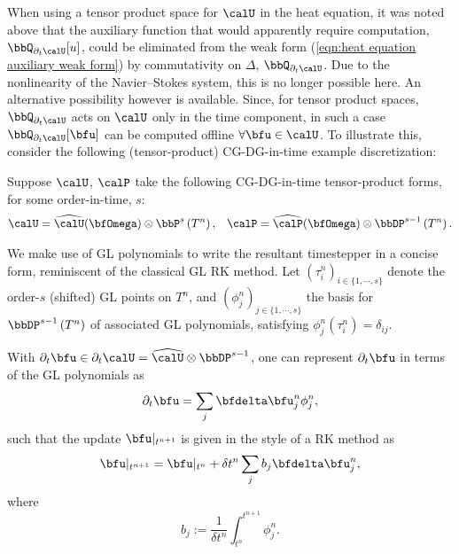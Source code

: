     When using a tensor product space for $\calU$ in the heat equation, it was noted above that the auxiliary function that would apparently require computation, $\bbQ_{\partial_{t}\calU}[u]$, could be eliminated from the weak form (\ref{eqn:heat equation auxiliary weak form}) by commutativity on $\Delta$, $\bbQ_{\partial_{t}\calU}$. Due to the nonlinearity of the Navier--Stokes system, this is no longer possible here. An alternative possibility however is available. Since, for tensor product spaces, $\bbQ_{\partial_{t}\calU}$ acts on $\calU$ only in the time component, in such a case $\bbQ_{\partial_{t}\calU}[\bfu]$ can be computed offline $\forall \bfu \in \calU$. To illustrate this, consider the following (tensor-product) CG-DG-in-time example discretization:

    \begin{example}
        Suppose $\calU$, $\calP$ take the following CG-DG-in-time tensor-product forms, for some order-in-time, $s$:
        \begin{align}
            \calU  =  \widehat{\calU}(\bfOmega)\otimes\bbP^{s}\left(T^{n}\right),  &&
            \calP  =  \widehat{\calP}(\bfOmega)\otimes\bbDP^{s - 1}\left(T^{n}\right).
        \end{align}

        We make use of GL polynomials to write the resultant timestepper in a concise form, reminiscent of the classical GL RK method. Let $\left(\tau^{n}_{i}\right)_{i \in \{1, \cdots, s\}}$ denote the order-$s$ (shifted) GL points on $T^{n}$, and $\left(\phi^{n}_{j}\right)_{j \in \{1, \cdots, s\}}$ the basis for $\bbDP^{s - 1}\left(T^{n}\right)$ of associated GL polynomials, satisfying $\phi^{n}_{j}(\tau^{n}_{i}) = \delta_{ij}$.

        With $\partial_{t}\bfu \in \partial_{t}\calU = \widehat{\calU}\otimes\bbDP^{s - 1}$, one can represent $\partial_{t}\bfu$ in terms of the GL polynomials as
        \begin{equation}
            \partial_{t}\bfu  =  \sum_{j}\bfdelta\bfu^{n}_{j}\phi^{n}_{j},
        \end{equation}
        such that the update $\bfu|_{t^{n + 1}}$ is given in the style of a RK method as
        \begin{equation}
            \bfu|_{t^{n + 1}}  =  \bfu|_{t^{n}} + \delta t^{n}\sum_{j}b_{j}\bfdelta\bfu^{n}_{j},
        \end{equation}
        where
        \begin{equation}\label{eqn:b_j definition}
            b_{j}  :=  \frac{1}{\delta t^{n}}\int_{t^{n}}^{t^{n + 1}}\phi^{n}_{j}.
        \end{equation}


\end{example}
